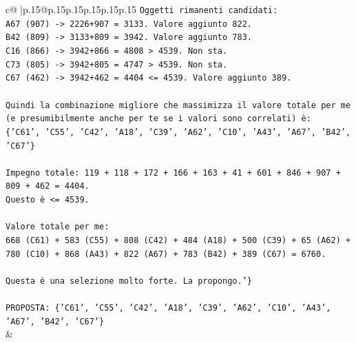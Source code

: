 \documentclass{article}
\begin{document}
{\begin{supertabular}{c@{$\;$}|p{.15\linewidth}@{}p{.15\linewidth}p{.15\linewidth}p{.15\linewidth}p{.15\linewidth}p{.15\linewidth}}
{{{\texttt{Oggetti rimanenti candidati:} \\
\texttt{A67 (907) {-}> 2226+907 = 3133. Valore aggiunto 822.} \\
\texttt{B42 (809) {-}> 3133+809 = 3942. Valore aggiunto 783.} \\
\texttt{C16 (866) {-}> 3942+866 = 4808 > 4539. Non sta.} \\
\texttt{C73 (805) {-}> 3942+805 = 4747 > 4539. Non sta.} \\
\texttt{C67 (462) {-}> 3942+462 = 4404 <= 4539. Valore aggiunto 389.} \\
\\ 
\texttt{Quindi la combinazione migliore che massimizza il valore totale per me (e presumibilmente anche per te se i valori sono correlati) è:} \\
\texttt{\{'C61', 'C55', 'C42', 'A18', 'C39', 'A62', 'C10', 'A43', 'A67', 'B42', 'C67'\}} \\
\\ 
\texttt{Impegno totale: 119 + 118 + 172 + 166 + 163 + 41 + 601 + 846 + 907 + 809 + 462 = 4404.} \\
\texttt{Questo è <= 4539.} \\
\\ 
\texttt{Valore totale per me:} \\
\texttt{668 (C61) + 583 (C55) + 808 (C42) + 484 (A18) + 500 (C39) + 65 (A62) + 780 (C10) + 868 (A43) + 822 (A67) + 783 (B42) + 389 (C67) = 6760.} \\
\\ 
\texttt{Questa è una selezione molto forte. La propongo.'\}} \\
\\ 
\texttt{PROPOSTA: \{'C61', 'C55', 'C42', 'A18', 'C39', 'A62', 'C10', 'A43', 'A67', 'B42', 'C67'\}} \\
            }
        }
    }
    & \\ \\


\end{supertabular}}
\end{document}
